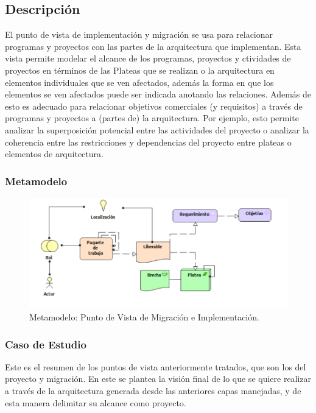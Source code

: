 \subsection{Descripción}
El punto de vista de implementación y migración se usa para relacionar programas y proyectos con las partes de la arquitectura que implementan. Esta vista permite modelar el alcance de los programas, proyectos y ctividades de proyectos en términos de las Plateas que se realizan o la arquitectura en elementos individuales que se ven afectados, además la forma en que los elementos se ven afectados puede ser indicada anotando las relaciones.
Además  de esto es adecuado para relacionar objetivos comerciales (y requisitos) a través de programas y proyectos a (partes de) la arquitectura. Por ejemplo, esto permite analizar la superposición potencial entre las actividades del proyecto o analizar la coherencia entre las restricciones y dependencias del proyecto entre plateas o elementos de arquitectura.

\subsubsection{Metamodelo}
\begin{figure}[h]
	\centering
	\includegraphics[width=1.0\textwidth]{imagenes/Metamodelos/Migracion/meta_Migracion_implementacion.pdf}
	\caption{Metamodelo: Punto de Vista de Migración e Implementación.}
	\label{fig:gap_analysis}
\end{figure}

\subsubsection{Caso de Estudio}
Este es el resumen de los puntos de vista anteriormente tratados, que son los del proyecto y migración. En este se plantea la visión final de lo que se quiere realizar a través de la arquitectura generada desde las anteriores capas manejadas, y de esta manera delimitar su alcance como proyecto.

